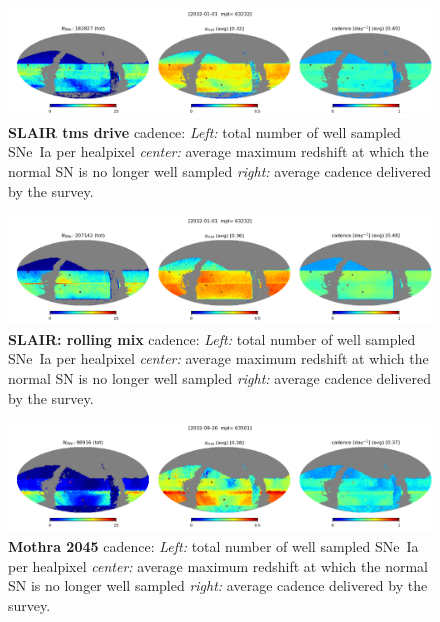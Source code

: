 \begin{figure}[h!]
  \begin{center}
    \includegraphics[width=\linewidth]{Figures/tms_drive_10yrs_64_maps.png}
    \caption{{\bf SLAIR tms drive} cadence: {\em Left:} total number of well
      sampled SNe~Ia per healpixel {\em center:} average maximum
      redshift at which the normal SN is no longer well sampled {\em
        right:} average cadence delivered by the survey.}
    \label{fig:tms_drive}
  \end{center}
\end{figure}

\begin{figure}[h!]
  \begin{center}
    \includegraphics[width=\linewidth]{Figures/rolling_mix_10yrs_64_maps.png}
    \caption{{\bf SLAIR: rolling mix} cadence: {\em Left:} total number of well
      sampled SNe~Ia per healpixel {\em center:} average maximum
      redshift at which the normal SN is no longer well sampled {\em
        right:} average cadence delivered by the survey.}
    \label{fig:rolling_mix}
  \end{center}
\end{figure}

\begin{figure}[h!]
  \begin{center}
    \includegraphics[width=\linewidth]{Figures/mothra_2045_64_maps.png}
    \caption{{\bf Mothra 2045} cadence: {\em Left:} total number of well
      sampled SNe~Ia per healpixel {\em center:} average maximum
      redshift at which the normal SN is no longer well sampled {\em
        right:} average cadence delivered by the survey.}
    \label{fig:mothra_2045}
  \end{center}
\end{figure}

